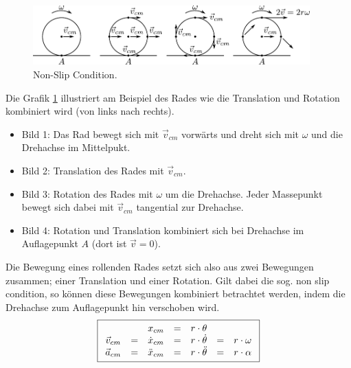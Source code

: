 \begin{figure}[h!]
	\centering
	\includegraphics[width=0.95\textwidth]{non-slip.pdf}
	\caption{Non-Slip Condition.}
	\label{fig:non-slip}
\end{figure}

\noindent
Die Grafik \ref{fig:non-slip} illustriert am Beispiel des Rades wie die 
Translation und Rotation kombiniert wird (von links nach rechts).
\begin{itemize}
	\item{Bild 1:} Das Rad bewegt sich mit $\vec{v}_{cm}$ vorwärts und
		dreht sich mit $\omega$ und die Drehachse im Mittelpukt.
	\item{Bild 2:} Translation des Rades mit $\vec{v}_{cm}$.
	\item{Bild 3:} Rotation des Rades mit $\omega$ um die Drehachse.
		Jeder Massepunkt bewegt sich dabei mit $\vec{v}_{cm}$
		tangential zur Drehachse.
	\item{Bild 4:} Rotation und Translation kombiniert sich bei
		Drehachse im Auflagepunkt $A$ (dort ist $\vec{v}=0$).
\end{itemize}
Die Bewegung eines rollenden Rades setzt sich also aus zwei Bewegungen
zusammen; einer Translation und einer Rotation. Gilt dabei die sog. 
non slip condition, so können diese Bewegungen kombiniert betrachtet 
werden, indem die Drehachse zum Auflagepunkt hin verschoben wird. 
\[ \boxed{\begin{array}{c c c c c c c}
		& & x_{cm} 
		&=& r \cdot \theta 
		& & \\
	\vec{v}_{cm} 
		&=& \dot{x}_{cm} 
		&=& r \cdot \dot{\theta }
		&=& r \cdot \omega \\
	\vec{a}_{cm} 
		&=& \ddot{x}_{cm}
		&=& r \cdot \ddot{\theta}
		&=& r \cdot \alpha
\end{array}}\]

